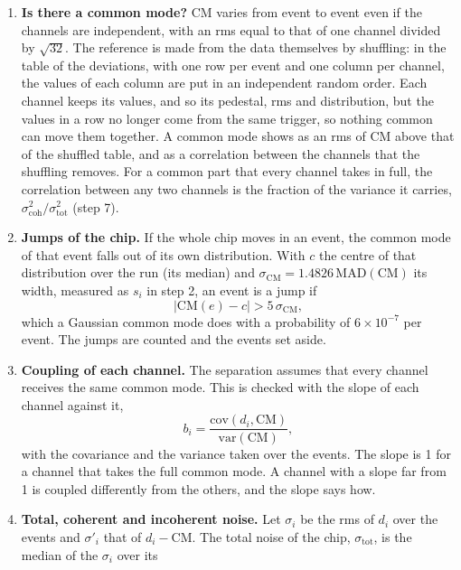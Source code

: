 \documentclass[11pt,a4paper]{article}
\begin{document}
\begin{enumerate}
  with $n(e)$ their number, 32 in almost every event.
\item \textbf{Is there a common mode?} CM varies from event to event even if the channels are
  independent, with an rms equal to that of one channel divided by $\sqrt{32}$. The reference
  is made from the data themselves by shuffling: in the table of the deviations, with one row
  per event and one column per channel, the values of each column are put in an independent
  random order. Each channel keeps its values, and so its pedestal, rms and distribution, but
  the values in a row no longer come from the same trigger, so nothing common can move them
  together. A common mode shows as an rms of CM above that of the shuffled table, and as a
  correlation between the channels that the shuffling removes. For a common part that every
  channel takes in full, the correlation between any two channels is the fraction of the
  variance it carries, $\sigma_\mathrm{coh}^2/\sigma_\mathrm{tot}^2$ (step 7).
\item \textbf{Jumps of the chip.} If the whole chip moves in an event, the common mode of that
  event falls out of its own distribution. With $c$ the centre of that distribution over the
  run (its median) and $\sigma_\mathrm{CM} = 1.4826\,\mathrm{MAD}(\mathrm{CM})$ its width,
  measured as $s_i$ in step 2, an event is a jump if
  \begin{equation*}
  |\mathrm{CM}(e) - c| > 5\, \sigma_\mathrm{CM} ,
  \end{equation*}
  which a Gaussian common mode does with a probability of $6\times10^{-7}$ per event. The jumps
  are counted and the events set aside.
\item \textbf{Coupling of each channel.} The separation assumes that every channel receives the
  same common mode. This is checked with the slope of each channel against it,
  \begin{equation*}
  b_i = \frac{\mathrm{cov}(d_i, \mathrm{CM})}{\mathrm{var}(\mathrm{CM})} ,
  \end{equation*}
  with the covariance and the variance taken over the events. The slope
  is 1 for a channel that takes the full common mode. A channel with a slope far from 1
  is coupled differently from the others, and the slope says how.
\item \textbf{Total, coherent and incoherent noise.}
  Let $\sigma_i$ be the rms of $d_i$ over the events and $\sigma'_i$ that of $d_i - \mathrm{CM}$.
  The total noise of the chip, $\sigma_\mathrm{tot}$, is the median of the $\sigma_i$ over its

\end{enumerate}
\end{document}
